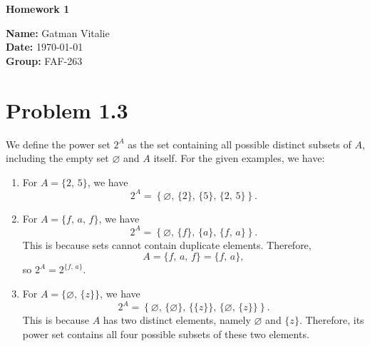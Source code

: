 \documentclass[12pt]{article}
\begin{document}
\begin{titlepage}
    \thispagestyle{fancy} %
    \centering
    
    \vspace*{4cm}

    {\Huge \bfseries Homework 1}

    \vspace{4cm}

    {\Large \textbf{Name:} Gatman Vitalie} \\[0.5em]
    {\Large \textbf{Date:} \today} \\[0.5em]
    {\Large \textbf{Group:} FAF-263}

    \vfill
\end{titlepage}

\newpage

\section*{Problem 1.3}

We define the power set $2^A$ as the set containing all possible distinct
subsets of $A$, including the empty set $\varnothing$ and $A$ itself.
For the given examples, we have:

\begin{enumerate}[label=\alph*)]

    \item For $A = \{2,\,5\}$, we have
    \[
    2^A = \left\{
    \varnothing,\,
    \{2\},\,
    \{5\},\,
    \{2,\,5\}
    \right\}.
    \]

    \item For $A = \{f,\,a,\,f\}$, we have
    \[
    2^A = \left\{
    \varnothing,\,
    \{f\},\,
    \{a\},\,
    \{f,\,a\}
    \right\}.
    \]
    This is because sets cannot contain duplicate elements. Therefore,
    \[
    A = \{f,\,a,\,f\} = \{f,\,a\},
    \]
    so $2^A = 2^{\{f,\,a\}}$.

    \item For $A = \{\varnothing,\,\{z\}\}$, we have
    \[
    2^A =
    \left\{
    \varnothing,\,
    \{\varnothing\},\,
    \{\{z\}\},\,
    \{\varnothing,\,\{z\}\}
    \right\}.
    \]
    This is because $A$ has two distinct elements, namely $\varnothing$
    and $\{z\}$. Therefore, its power set contains all four possible
    subsets of these two elements.

\end{enumerate}
\end{document}
